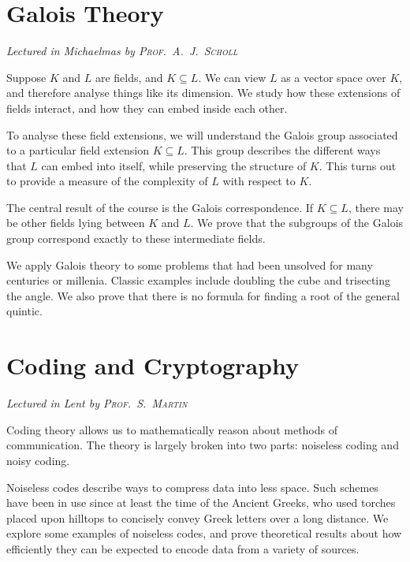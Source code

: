 \chapter[Galois Theory \\ \textnormal{\emph{Lectured in Michaelmas \oldstylenums{2022} by \textsc{Prof.\ A.\ J.\ Scholl}}}]{Galois Theory}
\emph{\Large Lectured in Michaelmas  by \textsc{Prof.\ A.\ J.\ Scholl}}

Suppose \( K \) and \( L \) are fields, and \( K \subseteq L \).
We can view \( L \) as a vector space over \( K \), and therefore analyse things like its dimension.
We study how these extensions of fields interact, and how they can embed inside each other.

To analyse these field extensions, we will understand the Galois group associated to a particular field extension \( K \subseteq L \).
This group describes the different ways that \( L \) can embed into itself, while preserving the structure of \( K \).
This turns out to provide a measure of the complexity of \( L \) with respect to \( K \).

The central result of the course is the Galois correspondence.
If \( K \subseteq L \), there may be other fields lying between \( K \) and \( L \).
We prove that the subgroups of the Galois group correspond exactly to these intermediate fields.

We apply Galois theory to some problems that had been unsolved for many centuries or millenia.
Classic examples include doubling the cube and trisecting the angle.
We also prove that there is no formula for finding a root of the general quintic.



\chapter[Coding and Cryptography \\ \textnormal{\emph{Lectured in Lent \oldstylenums{2023} by \textsc{Prof.\ S.\ Martin}}}]{Coding and Cryptography}
\emph{\Large Lectured in Lent  by \textsc{Prof.\ S.\ Martin}}

Coding theory allows us to mathematically reason about methods of communication.
The theory is largely broken into two parts: noiseless coding and noisy coding.

Noiseless codes describe ways to compress data into less space.
Such schemes have been in use since at least the time of the Ancient Greeks, who used torches placed upon hilltops to concisely convey Greek letters over a long distance.
We explore some examples of noiseless codes, and prove theoretical results about how efficiently they can be expected to encode data from a variety of sources.

